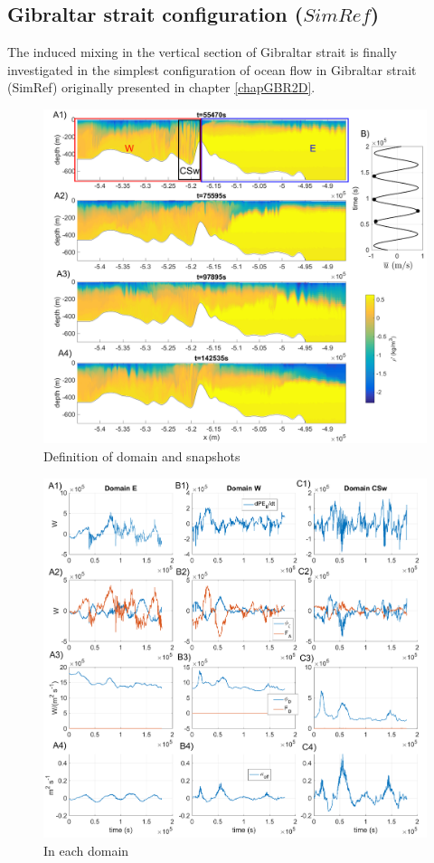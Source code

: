 \subsection{Gibraltar strait configuration ($SimRef$)}
The induced mixing in the vertical section of Gibraltar strait is finally investigated in the simplest configuration of ocean flow in Gibraltar strait (SimRef) originally presented in chapter \ref{chapGBR2D}.\\
\begin{figure}[h!]
\centering
\includegraphics[width=1\textwidth]{./CHAP_BPE/Fig_Kappa_CS_ex.png}
\caption{Definition of domain and snapshots}
\label{figCgbr2d_ex}
\end{figure}
\begin{figure}[h!]
\centering
\includegraphics[width=1\textwidth]{./CHAP_BPE/Fig_Kappa_CS.png}
\caption{In each domain}
\label{figCgbr2d}
\end{figure}
